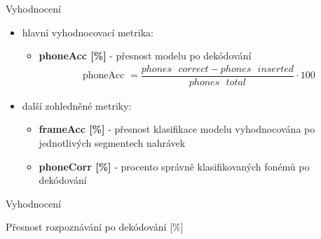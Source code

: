 \documentclass[10pt]{beamer}
\begin{document}
\begin{frame}{Vyhodnocení}
	\begin{itemize}
		\item hlavní vyhodnocovací metrika:
			\begin{itemize}
				\item \textbf{phoneAcc [\%]} - přesnost modelu po dekódování
					\begin{align*}
						\text{phoneAcc } = \dfrac{phones \text{ } correct - phones \text{ } inserted}{phones \text{ } total} \cdot 100
					\end{align*}
			\end{itemize}
		\item další zohledněné metriky:
			\begin{itemize}
				\item \textbf{frameAcc [\%]} - přesnost klasifikace modelu vyhodnocována po jednotlivých segmentech nahrávek
				\item \textbf{phoneCorr [\%]} - procento správně klasifikovaných fonémů po dekódování
			\end{itemize}
	\end{itemize}
\end{frame}

\begin{frame}{Vyhodnocení}
	\begin{table}[H]
		\centering
	\end{table}
	
	\centering
	Přesnost rozpoznávání po dekódování [\%]
\end{frame}
\end{document}
